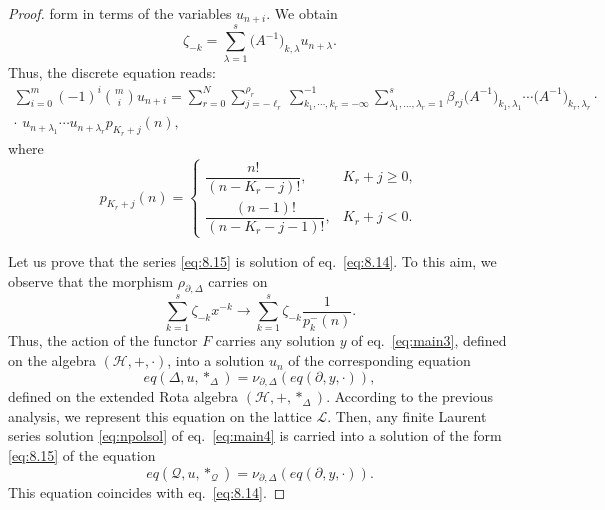\documentclass[10pt]{amsart}
\numberwithin{equation}{section}
\newcommand{\nn}{\nonumber}
\theoremstyle{definition}
\begin{document}
\begin{proof}
form in terms of the variables $u_{n+i}$. We obtain
\begin{equation}
\zeta _{-k}= \sum _{\lambda =1}^{s} \big(A^{-1}\big)_{k,\lambda}u_{n+
\lambda}.
\label{eq8.21}
\end{equation}
Thus, the discrete equation reads:
\begin{eqnarray}\nn
\sum _{i=0}^{m}(-1)^{i}\binom{m}{i}u_{n+i} = \sum _{r=0}^{N} \sum _{j=-
\ell _{r}}^{\rho _{r}} \sum _{k_{1},\cdots ,k_{r}=-\infty}^{-1} \sum _{
\lambda _{1},\ldots ,\lambda _{r}=1}^{s} \beta _{rj} \big(A^{-1}\big)_{k_{1},
\lambda _{1}}\cdots \big(A^{-1}\big)_{k_{r},\lambda _{r}} \cdot
\label{eq8.22}
\\
\cdot \,\, u_{n+\lambda _{1}}\cdots u_{n+\lambda _{r}}p_{K_{r}+j}(n),
\end{eqnarray}
where
\begin{equation}
p_{K_r+j}(n)=
\begin{cases}
\dfrac{n!}{(n-K_r-j)!}, & K_r+j\geq 0,
\\[10pt]
\dfrac{(n-1)!}{(n-K_r-j-1)!}, & K_r+j <0.
\end{cases}
\label{eq8.23}
\end{equation}

Let us prove that the series  \eqref{eq:8.15} is solution of eq.~\eqref{eq:8.14}. To this aim, we observe that the morphism
$\rho _{\partial ,\Delta}$ carries on
\begin{equation}
\sum _{k=1}^{s} \zeta _{-k} x^{-k} \longrightarrow \sum _{k=1}^{s}
\zeta _{-k} \frac{1}{p_{k}^{-}(n)}.
\label{eq8.24}
\end{equation}
Thus, the action of the functor $F$ carries any solution $y$ of eq.~\eqref{eq:main3},
defined on the algebra $(\mathcal{H},+,\cdot )$, into a solution
$u_{n}$ of the corresponding equation
\begin{equation*}
eq(\Delta ,u,*_{\Delta})=\nu _{\partial ,\Delta}(eq(\partial , y,
\cdot )),
\end{equation*}
defined on the extended Rota algebra $(\mathcal{H},+,*_{\Delta})$. According
to the previous analysis, we represent this equation on the lattice
$\mathcal{L}$. Then, any finite Laurent series solution  \eqref{eq:npolsol} of  eq.~\eqref{eq:main4} is carried into a solution of
the form  \eqref{eq:8.15} of the equation
\begin{equation*}
eq(\mathcal{Q},u,*_{\mathcal{Q}})=\nu _{\partial ,\Delta}(eq(
\partial ,y,\cdot )).
\end{equation*}
This equation coincides with eq.~\eqref{eq:8.14}.
\end{proof}
\end{document}
